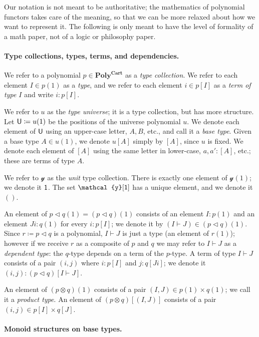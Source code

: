 \documentclass[11pt, one side, article]{memoir}
\theoremstyle{definition}
\theoremstyle{plain}
\newcommand{\Cat}[1]{\mathbf{#1}}%
\newcommand{\tn}[1]{\textnormal{#1}}
\newcommand{\yon}{\mathcal{y}}
\newcommand{\poly}{\Cat{Poly}}
\newcommand{\polycart}{\poly^{\Cat{Cart}}}
\newcommand{\0}{\textsf{0}}
\newcommand{\1}{\tn{\textsf{1}}}
\newcommand{\U}{\tn{\textsf{U}}}
\newcommand{\tri}{\mathbin{\triangleleft}}
\begin{document}
Our notation is not meant to be authoritative; the mathematics of polynomial functors takes care of the meaning, so that we can be more relaxed about how we want to represent it. The following is only meant to have the level of formality of a math paper, not of a logic or philosophy paper.

\paragraph{Type collections, types, terms, and dependencies.}
We refer to a polynomial $p\in\polycart$ as a \emph{type collection}. We refer to each element $I\in p(1)$ as a \emph{type}, and we refer to each element $i\in p[I]$ as a \emph{term of type $I$} and write $i:p[I]$.

We refer to $u$ as the \emph{type universe}; it is a type collection, but has more structure. Let $\U\coloneqq u(1)$ be the positions of the universe polynomial $u$. We denote each element of $\U$ using an upper-case letter, $A,B$, etc., and call it a \emph{base type}. Given a base type $A\in u(1)$, we denote $u[A]$ simply by $[A]$, since $u$ is fixed. We denote each element of $[A]$ using the same letter in lower-case, $a,a':[A]$, etc.; these are terms of type $A$.

We refer to $\yon$ as the \emph{unit} type collection. There is exactly one element of $\yon(1)$; we denote it $\1$. The set $\yon[\1]$ has a unique element, and we denote it $()$.

An element of $p\tri q(1)=(p\tri q)(1)$ consists of an element $I:p(1)$ and an element $J i:q(1)$ for every $i:p[I]$; we denote it by $(I\vdash J)\in (p\tri q)(1)$. Since $r\coloneqq p\tri q$ is a polynomial, $I\vdash J$ is just a type (an element of $r(1)$); however if we receive $r$ as a composite of $p$ and $q$ we may refer to $I\vdash J$ as a \emph{dependent type}: the $q$-type depends on a term of the $p$-type. A term of type $I\vdash J$ consists of a pair $(i,j)$ where $i:p[I]$ and $j: q[J i]$; we denote it $(i,j):(p\tri q)[I\vdash J]$.

An element of $(p\otimes q)(1)$ consists of a pair $(I,J)\in p(1)\times q(1)$; we call it a \emph{product type}. An element of $(p\otimes q)[(I,J)]$ consists of a pair $(i,j)\in p[I]\times q[J]$. 

\paragraph{Monoid structures on base types.}
\end{document}
